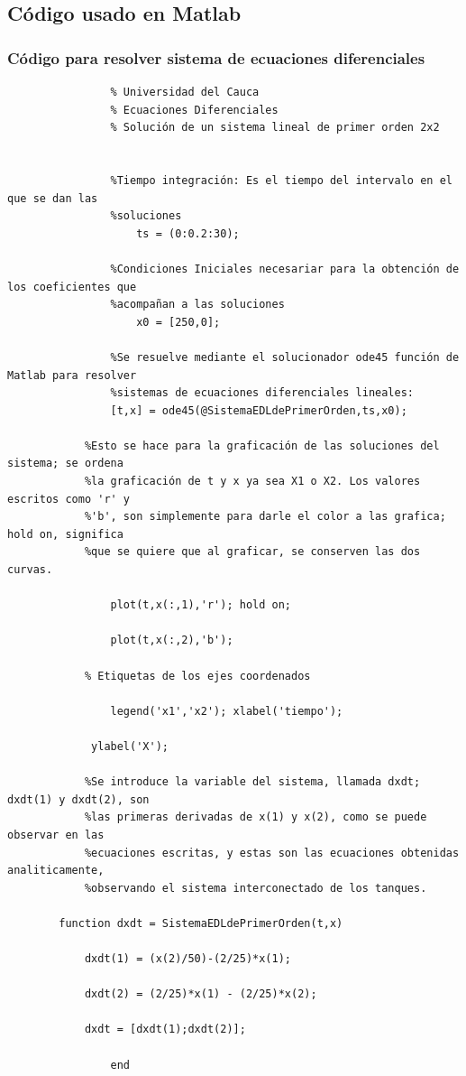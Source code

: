 \documentclass[titlepage]{article}
\begin{document}
        \subsection{Código usado en Matlab}
			\subsubsection{Código para resolver sistema de ecuaciones diferenciales}            
            \begin{verbatim}
                % Universidad del Cauca
                % Ecuaciones Diferenciales
                % Solución de un sistema lineal de primer orden 2x2


                %Tiempo integración: Es el tiempo del intervalo en el que se dan las 
                %soluciones
                    ts = (0:0.2:30);

                %Condiciones Iniciales necesariar para la obtención de los coeficientes que
                %acompañan a las soluciones
                    x0 = [250,0];

                %Se resuelve mediante el solucionador ode45 función de Matlab para resolver
                %sistemas de ecuaciones diferenciales lineales:
                [t,x] = ode45(@SistemaEDLdePrimerOrden,ts,x0);

            %Esto se hace para la graficación de las soluciones del sistema; se ordena
            %la graficación de t y x ya sea X1 o X2. Los valores escritos como 'r' y
            %'b', son simplemente para darle el color a las grafica; hold on, significa
            %que se quiere que al graficar, se conserven las dos curvas.

                plot(t,x(:,1),'r'); hold on;

                plot(t,x(:,2),'b');

            % Etiquetas de los ejes coordenados

                legend('x1','x2'); xlabel('tiempo');

             ylabel('X');

            %Se introduce la variable del sistema, llamada dxdt; dxdt(1) y dxdt(2), son
            %las primeras derivadas de x(1) y x(2), como se puede observar en las
            %ecuaciones escritas, y estas son las ecuaciones obtenidas analiticamente,
            %observando el sistema interconectado de los tanques.

        function dxdt = SistemaEDLdePrimerOrden(t,x)

            dxdt(1) = (x(2)/50)-(2/25)*x(1);

            dxdt(2) = (2/25)*x(1) - (2/25)*x(2);

            dxdt = [dxdt(1);dxdt(2)];

                end    
            \end{verbatim}
\end{document}
